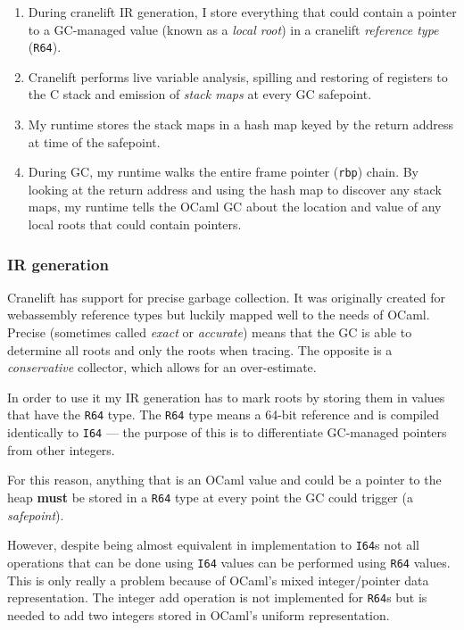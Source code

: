 \begin{enumerate}
      \item During cranelift IR generation, I store everything that could contain a pointer to a
            GC-managed value (known as a \emph{local root}) in a cranelift \emph{reference type}
            (\texttt{R64}).
      \item Cranelift performs live variable analysis, spilling and restoring of registers to the C
            stack and emission of \emph{stack maps} at every GC safepoint.
      \item My runtime stores the stack maps in a hash map keyed by the return address at time of
            the safepoint.
      \item During GC, my runtime walks the entire frame pointer (\texttt{rbp}) chain. By looking
            at the return address and using the hash map to discover any stack maps, my runtime
            tells the OCaml GC about the location and value of any local roots that could contain
            pointers.
\end{enumerate}

\subsubsection{IR generation} \label{gc-ir}

Cranelift has support for precise garbage collection. It was originally created for webassembly
reference types but luckily mapped well to the needs of OCaml. Precise (sometimes called
\emph{exact} or \emph{accurate}) means that the GC is able to determine all roots and only the
roots
when tracing. The opposite is a \emph{conservative} collector, which allows for an over-estimate.

In order to use it my IR generation has to mark roots by storing them in values that have the
\texttt{R64} type. The \texttt{R64} type means a 64-bit reference and is compiled identically to
\texttt{I64} --- the purpose of this is to differentiate GC-managed pointers from other integers.

For this reason, anything that is an OCaml value and could be a pointer to the heap \textbf{must}
be stored in a \texttt{R64} type at every point the GC could trigger (a \emph{safepoint}).

However, despite being almost equivalent in implementation to \texttt{I64}s not all operations that
can be done using \texttt{I64} values can be performed using \texttt{R64} values. This is only
really a
problem because of OCaml's mixed integer/pointer data representation. The integer add operation is
not
implemented for \texttt{R64}s but is needed to add two integers stored in OCaml's uniform
representation.

